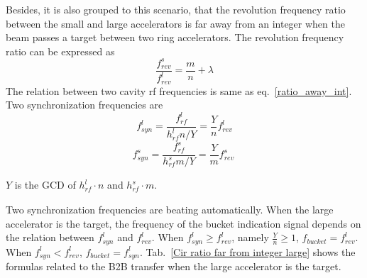 %
%




Besides, it is also grouped to this scenario, that the revolution frequency ratio between the small and large accelerators is far away from an integer when the beam passes a target between two ring accelerators. The revolution frequency ratio can be expressed as
\begin{equation} 
\frac{f_{\mathit{rev}}^{s}}{f_{\mathit{rev}}^{l}}=\frac{m}{n}+ \lambda\label{close_to_interger2}
\end{equation}
The relation between two cavity rf frequencies is same as eq.~\ref{ratio_away_int}. Two synchronization frequencies are
\begin{equation}
f_{\mathit{syn}}^{l}=\frac{f_{\mathit{rf}}^{l}}{h^l_\mathit{rf}n/Y}=\frac{Y}{n}f_{\mathit{rev}}^{l} \label{synch_freq111_r}
\end{equation}
\begin{equation}
f_{\mathit{syn}}^{s}=\frac{f_{\mathit{rf}}^{s}}{h^s_\mathit{rf}m/Y}=\frac{Y}{m}f_{\mathit{rev}}^{s} \ \label{synch_freq222_r}
\end{equation}

$Y$ is the GCD of $h^l_\mathit{rf}\cdot n$ and $h^s_\mathit{rf} \cdot m$.

Two synchronization frequencies are beating automatically. When the large accelerator is the target, the frequency of the bucket indication signal depends on the relation between $f_{\mathit{syn}}^{l}$ and $f_{\mathit{rev}}^{l}$. When $f_{\mathit{syn}}^{l}\ge f_{\mathit{rev}}^{l}$, namely $\frac{Y}{n}\ge1$, $f_\mathit{bucket}=f_{\mathit{rev}}^{l}$. When $f_{\mathit{syn}}^{l}< f_{\mathit{rev}}^{l}$, $f_\mathit{bucket}=f_{\mathit{syn}}^{l}$. Tab.~\ref{Cir ratio far from integer large} shows the formulas related to the B2B transfer when the large accelerator is the target.

